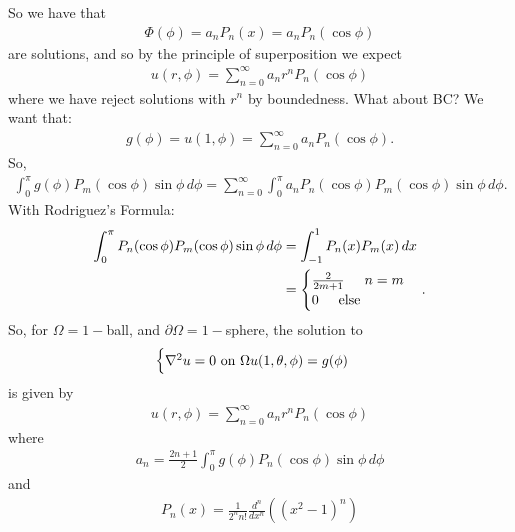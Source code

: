 \documentclass{article}
\theoremstyle{definition}
\newcommand{\p}{\partial}
\newcommand{\f}[2]{\frac{#1}{#2}}
\newcommand{\lp}{\left(}
\newcommand{\rp}{\right)}
\begin{document}
\begin{enumerate}
	So we have that
	\begin{align*}
	\Phi(\phi) = a_nP_n(x) = a_nP_n(\cos\phi)
	\end{align*}
	are solutions, and so by the principle of superposition we expect
	\begin{align*}
	\boxed{u(r,\phi) = \sum^\infty_{n=0}a_nr^nP_n(\cos\phi)}
	\end{align*}
	where we have reject solutions with $r^n$ by boundedness. What about BC? We want that:
	\begin{align*}
	g(\phi) = u(1,\phi) = \sum^\infty_{n=0}a_nP_n(\cos\phi).
	\end{align*}
	So,
	\begin{align*}
	\int^\pi_0 g(\phi)P_m(\cos\phi)\sin\phi\,d\phi =  \sum^\infty_{n=0}  \int^\pi_0 a_nP_n(\cos\phi)P_m(\cos\phi)\sin\phi \,d\phi.
	\end{align*}
	With Rodriguez's Formula:
	\begin{align*}
	\int^\pi_0 P_n(\cos\phi)P_m(\cos\phi)\sin\phi \,d\phi &= 
	\int^{1}_{-1} P_n(x)P_m(x) \,dx\\
	&= \begin{cases}
	\f{2}{2m+1}\hspace{0.5cm} n=m\\
	0\hspace{0.5cm}\text{else}
	\end{cases}.
	\end{align*}
	So, for $\Omega = 1-$ball, and $\p\Omega = 1-$sphere, the solution to 
	\begin{align*}
	\begin{cases}
	\laplacian u = 0 \text{ on }\Omega
	u(1,\theta,\phi) = g(\phi)
	\end{cases}
	\end{align*}
	is given by
	\begin{align*}
	\boxed{u(r,\phi) = \sum^\infty_{n=0} a_nr^nP_n(\cos\phi) }
	\end{align*}
	where
	\begin{align*}
	\boxed{a_n = \f{2n+1}{2}\int^\pi_0 g(\phi)P_n(\cos\phi)\sin\phi\,d\phi }
	\end{align*}
	and
	\begin{align*}
	\boxed{P_n(x) = \f{1}{2^n n!}\f{d^n}{dx^n}\lp (x^2 - 1)^n \rp}
	\end{align*}
\end{enumerate}




\newpage
\end{document}
